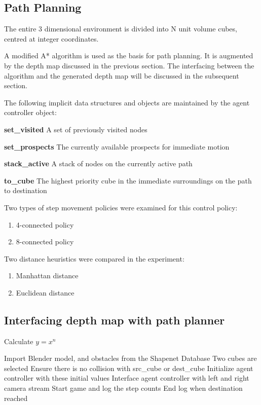 \subsection{Path Planning}
The entire 3 dimensional environment is divided into N unit volume cubes, centred at integer coordinates.
 
A modified A* algorithm is used as the basis for path planning. It is augmented by the depth map discussed in the previous section. The interfacing between the algorithm and the generated depth map will be discussed in the subsequent section.

The following implicit data structures and objects are maintained by the agent controller object:
 
\textbf{set\_visited}
A set of previously visited nodes
 
\textbf{set\_prospects}
The currently available prospects for immediate motion
 
\textbf{stack\_active}
A stack of nodes on the currently active path
 
\textbf{to\_cube}
The highest priority cube in the immediate surroundings on the path to destination

Two types of step movement policies were examined for this control policy:
\begin{enumerate}
\item 4-connected policy
\item 8-connected policy
\end{enumerate}

Two distance heuristics were compared in the experiment:
\begin{enumerate}
\item Manhattan distance
\item Euclidean distance
\end{enumerate}

\subsection{Interfacing depth map with path planner}


\begin{algorithm}
\caption{Calculate $y = x^n$}
\label{alg1}
\begin{algorithmic}[1]
\STATE Import Blender model, and obstacles from the Shapenet Database
\STATE Two cubes are selected
\STATE Ensure there is no collision with src\_cube or dest\_cube
\STATE Initialize agent controller with these initial values
\STATE Interface agent controller with left and right camera stream
\STATE Start game and log the step counts
\STATE End log when destination reached
\end{algorithmic}
\end{algorithm}

